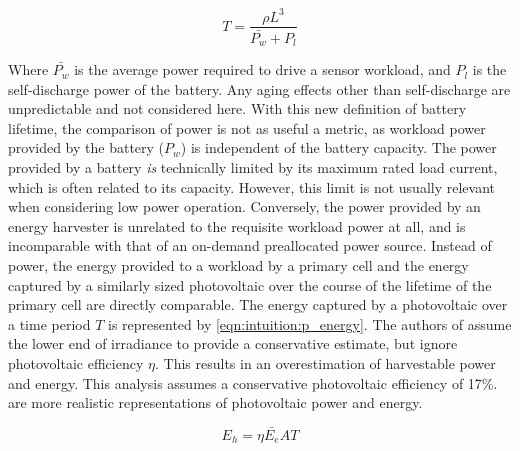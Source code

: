 \begin{equation}
\label{eq:intuition:battery_life}
T = \frac{\rho L^3}{\bar{P_w} + P_l}
\end{equation}

\noindent Where $\bar{P_w}$ is the average power required to drive a sensor workload, and $P_l$ is the self-discharge power of the battery. 
Any aging effects other than self-discharge are unpredictable and not considered here. 
With this new definition of battery lifetime, the comparison of power is not as useful a metric, as workload power provided by the battery ($P_w$) is independent of the battery capacity. 
The power provided by a battery \textit{is} technically limited by its maximum rated load current, which is often related to its capacity. 
However, this limit is not usually relevant when considering low power operation.
Conversely, the power provided by an energy harvester is unrelated to the requisite workload power at all, and is incomparable with that of an on-demand preallocated power source.
Instead of power, the energy provided to a workload by a primary cell and the energy captured by a similarly sized photovoltaic over the course of the lifetime of the primary cell are directly comparable.
The energy captured by a photovoltaic over a time period $T$ is represented by \cref{eqn:intuition:p_energy}.
The authors of \cite{yervaGrafting12} assume the lower end of irradiance to provide a conservative estimate, but ignore photovoltaic efficiency $\eta$. This results in an overestimation of harvestable power and energy.
This analysis assumes a conservative photovoltaic efficiency of 17\%.
 are more realistic representations of photovoltaic power and energy. 

\begin{equation} \label{eqn:intuition:p_energy}
E_h = \eta \bar{E_e} A T 
\end{equation}



